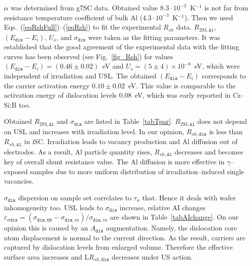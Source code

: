 \documentclass[aip,jap, amsmath,amssymb,reprint]{revtex4-1}
\begin{document}
$\alpha$ was determined from g7SC data.
Obtained value $8.3\cdot10^{-3}$~K$^{-1}$ is not far from resistance temperature coefficient of bulk Al ($4.3\cdot10^{-3}$~K$^{-1}$).
Then we used Eqs.~(\ref{eqRshFull})--(\ref{eqRsh}) to fit the experimental $R_{sh}$ data.
$R_{293,\mathtt{Al}}$, $(E_{\mathtt{dis}}-E_i)$, $U_s$, and $\sigma_{\mathtt{dis}}$ were taken as the fitting parameters.
It was established that the good agreement of the experimental data with the fitting curves has been observed (see Fig.~\ref{fig_Rsh}) for values $(E_{\mathtt{dis}}-E_i)=(0.46\pm0.02)$~eV and $U_s=(5\pm4)\times10^{-8}$~eV, which were independent of irradiation and USL.
The obtained $(E_{\mathtt{dis}}-E_i)$ corresponds to the carrier activation energy $0.10\pm0.02$~eV.
This value is comparable to the
activation energy of dislocation levels $0.08$~eV,
which was early reported\cite{disl10:Castaldini,disl10:Isakova,disl10:Yu,disl10:Kveder,disl10:Trushin}
in Cz--Si:B too.\cite{disl10:Castaldini,disl10:Isakova,disl10:Yu}



Obtained $R_{293,\mathtt{Al}}$ and $\sigma_{\mathtt{dis}}$ are listed in Table~\ref{tabTpar}.
$R_{293,\mathtt{Al}}$ does not depend on USL and increases with irradiation level.
In our opinion, $R_{sh,\mathtt{dis}}$ is less than $R_{sh,\mathtt{Al}}$ in iSC.
Irradiation leads to vacancy production and Al diffusion out of electrodes.
As a result, Al particle quantity rises, $R_{sh,\mathtt{Al}}$ decreases and becomes key of overall shunt resistance value.
The Al diffusion is more effective in $\gamma$--exposed samples due to more uniform distribution of irradiation--induced single vacancies.

$\sigma_{\mathtt{dis}}$ dispersion on sample set correlates to $\tau_n$ that.
Hence it deals with wafer inhomogeneity too.
USL leads to $\sigma_{\mathtt{dis}}$ increase, relative AI changes
$\varepsilon_{\sigma\mathtt{dis}}=(\sigma_{\mathtt{dis,US}}-\sigma_{\mathtt{dis},in})/\sigma_{\mathtt{dis},in}$
are shown in Table~\ref{tabAIchange}.
On our opinion this is caused by an $A_\mathtt{dis}$ augmentation.
Namely, the dislocation core atom displacement  is  normal to the  current direction.
As the result, carriers are captured by dislocation levels from enlarged volume.
Therefore the effective surface area increases and L$R_{sh,\mathtt{dis}}$ decreases under US action.
\end{document}

